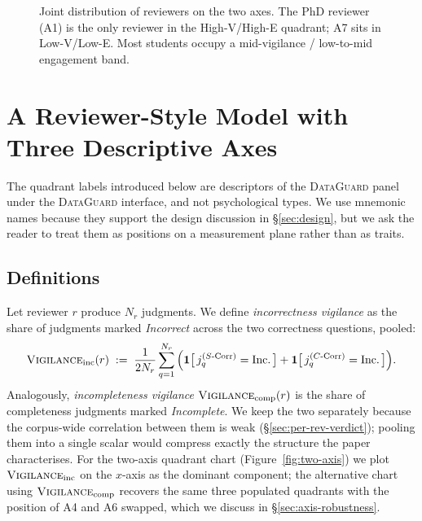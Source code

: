 \documentclass[11pt,a4paper]{article}
\newcommand{\dataguard}{\textsc{DataGuard}}
\newcommand{\Acc}[1]{\textsf{A#1}}
\begin{document}
\begin{figure}[!htbp]
\caption{Joint distribution of reviewers on the two axes. The
PhD reviewer (\Acc{1}) is the only reviewer in the High-V/High-E
quadrant; \Acc{7} sits in Low-V/Low-E. Most students occupy a
mid-vigilance / low-to-mid engagement band.}
\label{fig:joint-rev}
\end{figure}

\section{A Reviewer-Style Model with Three Descriptive Axes}
\label{sec:two-axis}

The quadrant labels introduced below are descriptors of the
\dataguard{} panel under the \dataguard{} interface, and not
psychological types. We use mnemonic names because they support
the design discussion in \S\ref{sec:design}, but we ask the reader
to treat them as positions on a measurement plane rather than as
traits.

\subsection{Definitions}
\label{sec:axis-defs}

Let reviewer $r$ produce $N_r$ judgments. We define
\emph{incorrectness vigilance} as the share of judgments marked
\emph{Incorrect} across the two correctness questions, pooled:
%
\[
\textsc{Vigilance}_{\text{inc}}(r) \;:=\;
   \frac{1}{2 N_r}\sum_{q=1}^{N_r}\Big(
   \mathbf{1}\big[\,j^{(S\text{-Corr})}_q = \text{Inc.}\,\big] +
   \mathbf{1}\big[\,j^{(C\text{-Corr})}_q = \text{Inc.}\,\big]
   \Big).
\]
%
Analogously, \emph{incompleteness vigilance}
$\textsc{Vigilance}_{\text{comp}}(r)$ is the share of completeness
judgments marked \emph{Incomplete}. We keep the two separately because
the corpus-wide correlation between them is weak
(\S\ref{sec:per-rev-verdict}); pooling them
into a single scalar would compress exactly the structure the paper
characterises. For the two-axis quadrant chart
(Figure~\ref{fig:two-axis}) we plot
$\textsc{Vigilance}_{\text{inc}}$ on the $x$-axis as the dominant
component; the alternative chart using
$\textsc{Vigilance}_{\text{comp}}$ recovers the same three populated
quadrants with the position of \Acc{4} and \Acc{6} swapped, which we
discuss in \S\ref{sec:axis-robustness}.
\end{document}
